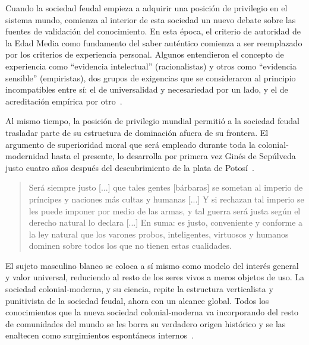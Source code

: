 \documentclass[a4paper,11pt]{book}
\theoremstyle{definition}
\begin{document}
Cuando la sociedad feudal empieza a adquirir una posición de privilegio en el sistema mundo, comienza al interior de esta sociedad un nuevo debate sobre las fuentes de validación del conocimiento.
%
En esta época, el criterio de autoridad de la Edad Media como fundamento del saber auténtico comienza a ser reemplazado por los criterios de experiencia personal.
%
Algunos entendieron el concepto de experiencia como ``evidencia intelectual'' (racionalistas) y otros como ``evidencia sensible'' (empiristas), dos grupos de exigencias que se consideraron al principio incompatibles entre sí: el de universalidad y necesariedad por un lado, y el de acreditación empírica por otro~\cite{samaja1999-epistemologiaYMetodologia}.


Al mismo tiempo, la posición de privilegio mundial permitió a la sociedad feudal trasladar parte de su estructura de dominación afuera de su frontera.
%
El argumento de superioridad moral que será empleado durante toda la colonial-modernidad hasta el presente, lo desarrolla por primera vez Ginés de Sepúlveda justo cuatro años después del descubrimiento de la plata de Potosí~\cite{dussel2020-primerDebate}.
%
\begin{quotation}
 Será siempre justo [...] que tales gentes [bárbaras] se sometan al imperio de príncipes y naciones más cultas y humanas [...] Y si rechazan tal imperio se les puede imponer por medio de las armas, y tal guerra será justa según el derecho natural lo declara [...] En suma: es justo, conveniente y conforme a la ley natural que los varones probos, inteligentes, virtuosos y humanos dominen sobre todos los que no tienen estas cualidades.%
\end{quotation}
%
El sujeto masculino blanco se coloca a sí mismo como modelo del interés general y valor universal, reduciendo al resto de los seres vivos a meros objetos de uso.
%
La sociedad colonial-moderna, y su ciencia, repite la estructura verticalista y punitivista de la sociedad feudal, ahora con un alcance global.
%
Todos los conocimientos que la nueva sociedad colonial-moderna va incorporando del resto de comunidades del mundo se les borra su verdadero origen histórico y se las enaltecen como surgimientos espontáneos internos~\cite{dussel1992-encubrimiento}.

\end{document}
